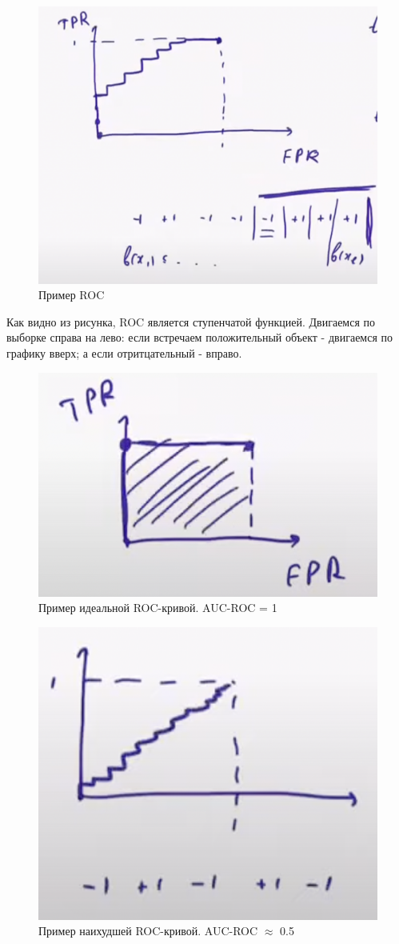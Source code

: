                 \begin{figure}[H]
                    \centering
                    \includegraphics[width=0.55 \textwidth]{images/5lecture/ROC_example.png}
                    \caption{Пример ROC}
                \end{figure}

                Как видно из рисунка, ROC является ступенчатой функцией. Двигаемся по выборке справа на лево: если встречаем положительный объект - двигаемся по графику вверх; а если отритцательный - вправо.

                \begin{figure}[H]
                    \centering
                    \includegraphics[width=0.35 \textwidth]{images/5lecture/Perfect_ROC.png}
                    \caption{Пример идеальной ROC-кривой. AUC-ROC = 1}
                \end{figure}

                \begin{figure}[H]
                    \centering
                    \includegraphics[width=0.35 \textwidth]{images/5lecture/Worst_ROC.png}
                    \caption{Пример наихудшей ROC-кривой. AUC-ROC $\approx$ 0.5}
                \end{figure}

